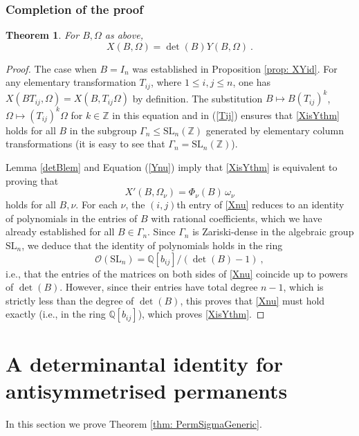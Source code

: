 \documentclass[10pt]{amsart}
\newcommand{\QQ}{{\mathbb Q}}
\newcommand{\ZZ}{{\mathbb Z}}
\theoremstyle{plain}
\newtheorem{thm}{Theorem}
\newcommand{\0}{\color{blue}{\mathsf{0}}}
\begin{document}
\subsubsection{Completion of the proof}
\begin{thm} For $B, \Omega$ as above, 
\begin{equation} \label{XisYthm} X(B,\Omega) = \det(B) Y(B,\Omega) \ .  \end{equation}
\end{thm}
\begin{proof}
The case when $B=I_n$ was established in Proposition \ref{prop: XYid}.
For any elementary transformation $T_{ij}$, where $1\leq i,j \leq n$, one has $X(BT_{ij},\Omega)=X(B, T_{ij}\Omega)$  by definition.
The substitution $B\mapsto B (T_{ij})^k$, $\Omega\mapsto (T_{ij})^k\Omega$ for $k\in\ZZ$
in this equation and in (\ref{Tij}) ensures that \eqref{XisYthm} holds for all $B$ in the subgroup $\Gamma_n \leq \mathrm{SL}_n(\ZZ)$ generated by elementary column transformations (it is easy to see that
$\Gamma_n=\mathrm{SL}_n(\ZZ)$).

Lemma \ref{detBlem} and Equation (\ref{Ynu}) imply that \eqref{XisYthm} is equivalent to proving that
\begin{equation}\label{Xnu}
X'(B,\Omega_\nu) = \Phi_{\nu}(B)\,\omega_\nu
\end{equation}
holds for all $B, \nu$. For each $\nu$, the $(i,j)$th  entry of \eqref{Xnu} reduces to an  identity of polynomials in the entries of $B$ with rational coefficients, which we have already established   for all $B\in \Gamma_n$. Since   $\Gamma_n$ is Zariski-dense 
in the algebraic group $\mathrm{SL}_n$, we deduce that the identity of polynomials holds in the ring
\[  \mathcal{O}(\mathrm{SL}_n) = \QQ[b_{ij}] / (\det(B) - 1) \ ,  \]
i.e., that the entries of the matrices on both sides  of \eqref{Xnu} coincide up to powers of $ \det(B)$. 
However, since their  entries have total degree $n-1$, which is strictly less than the  degree of $\det(B)$, this proves that \eqref{Xnu} must hold
exactly (i.e., in the ring $\QQ[b_{ij}]$), which proves \eqref{XisYthm}. \end{proof}

\section{A determinantal identity for antisymmetrised permanents} \label{Appendix2}

In this section we prove Theorem \ref{thm: PermSigmaGeneric}. 
\end{document}
